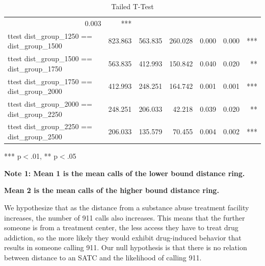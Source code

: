 \documentclass[12pt]{article}
\begin{document}
\begin{table}[h]
\begin{tabular}{lllllll}
  \multicolumn{1}{r}{0.003} &
  \multicolumn{1}{r}{***} \\
\multicolumn{1}{l}{ttest dist\_group\_1250 == dist\_group\_1500} &
  \multicolumn{1}{|r}{823.863} &
  \multicolumn{1}{r}{563.835} &
  \multicolumn{1}{r}{260.028} &
  \multicolumn{1}{r}{0.000} &
  \multicolumn{1}{r}{0.000} &
  \multicolumn{1}{r}{***} \\
\multicolumn{1}{l}{ttest dist\_group\_1500 == dist\_group\_1750} &
  \multicolumn{1}{|r}{563.835} &
  \multicolumn{1}{r}{412.993} &
  \multicolumn{1}{r}{150.842} &
  \multicolumn{1}{r}{0.040} &
  \multicolumn{1}{r}{0.020} &
  \multicolumn{1}{r}{**} \\
\multicolumn{1}{l}{ttest dist\_group\_1750 == dist\_group\_2000} &
  \multicolumn{1}{|r}{412.993} &
  \multicolumn{1}{r}{248.251} &
  \multicolumn{1}{r}{164.742} &
  \multicolumn{1}{r}{0.001} &
  \multicolumn{1}{r}{0.001} &
  \multicolumn{1}{r}{***} \\
\multicolumn{1}{l}{ttest dist\_group\_2000 == dist\_group\_2250} &
  \multicolumn{1}{|r}{248.251} &
  \multicolumn{1}{r}{206.033} &
  \multicolumn{1}{r}{42.218} &
  \multicolumn{1}{r}{0.039} &
  \multicolumn{1}{r}{0.020} &
  \multicolumn{1}{r}{**} \\
  \multicolumn{1}{l}{ttest dist\_group\_2250 == dist\_group\_2500} &
  \multicolumn{1}{|r}{206.033} &
  \multicolumn{1}{r}{135.579} &
  \multicolumn{1}{r}{70.455} &
  \multicolumn{1}{r}{0.004} &
  \multicolumn{1}{r}{0.002} &
  \multicolumn{1}{r}{***} \\
\cline{1-7}
\end{tabular}
\caption{Tailed T-Test}
\label{tabl:enter-label}
\break
\footnotesize{*** p$<$.01, ** p$<$.05}

\textbf{Note 1: Mean 1 is the mean calls of the lower bound distance ring.}

\textbf{Mean 2 is the mean calls of the higher bound distance ring.}
\end{table}
We hypothesize that as the distance from a substance abuse treatment facility increases, the number of 911 calls also increases. This means that the further someone is from a treatment center, the less access they have to treat drug addiction, so the more likely they would exhibit drug-induced behavior that results in someone calling 911. Our null hypothesis is that there is no relation between distance to an SATC and the likelihood of calling 911. 
\end{document}
